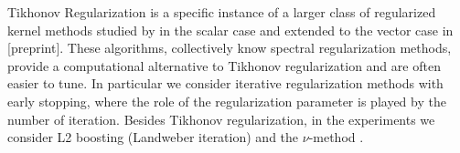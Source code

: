 Tikhonov Regularization is a specific instance of a larger class of regularized kernel methods
studied by \cite{LoGerfo08Spectral} in  the scalar case and extended to the vector case in [preprint].
These algorithms, collectively know  spectral regularization methods, provide a  computational alternative to Tikhonov regularization and are often easier to tune. In particular we consider 
iterative regularization methods with early stopping, where the role of the regularization 
parameter is played by the number of iteration. Besides Tikhonov regularization, in  the experiments we consider L2 boosting (Landweber iteration) \cite{bulmann02boosting,LoGerfo08Spectral} and the $\nu$-method \cite{LoGerfo08Spectral}. 
%

